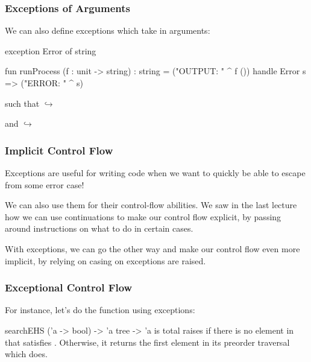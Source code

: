 \documentclass[aspectratio=169]{beamer}
\begin{document}
\begin{frame}[fragile]
  \frametitle{Exceptions of Arguments}

  We can also define exceptions which take in arguments:
  \begin{codeblock}
    exception Error of string

    fun runProcess (f : unit -> string) : string =
      ("OUTPUT: " ^ f ())
      handle Error s => ("ERROR: " ^ s)
  \end{codeblock}

  \pause
  \vspace{\fill}

  such that
   $\hookrightarrow$ 

  \pause
  \vspace{\fill}

  and
   $\hookrightarrow$ 
\end{frame}


\begin{frame}[fragile]
  \frametitle{Implicit Control Flow}

  Exceptions are useful for writing code when we want to quickly be able to escape
  from some error case!

  \pause
  \vspace{\fill}

  We can also use them for their control-flow abilities. We saw in the last lecture
  how we can use continuations to make our control flow explicit, by passing
  around instructions on what to do in certain cases.

  \pause
  \vspace{\fill}

  With exceptions, we can go the other way and make our control flow even more implicit,
  by relying on casing on exceptions are raised.
\end{frame}

\begin{frame}[fragile]
  \frametitle{Exceptional Control Flow}

  For instance, let's do the  function using exceptions:

  \pause
  \spec
    {searchEHS}
    {('a -> bool) -> 'a tree -> 'a}
    { is total}
    { raises  if there is no element in
     that satisfies . Otherwise, it returns the first element
    in its preorder traversal which does.}
\end{frame}
\end{document}
